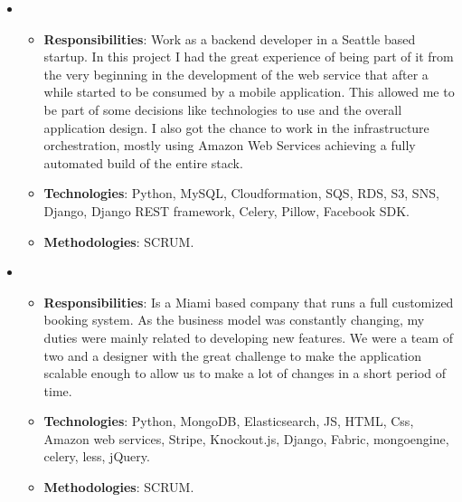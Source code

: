 \documentclass[11pt,a4paper,sans]{moderncv}        %
\begin{document}
  {
    \begin{itemize}
      \item
        \begin{itemize}
          \item \textbf{Responsibilities}: Work as a backend developer in a Seattle based startup. In this project I had the great experience of being part of it from the very beginning in the development of the web service that after a while started to be consumed by a mobile application. This allowed me to be part of some
decisions like technologies to use and the overall application design. I also got the chance to work in the infrastructure orchestration, mostly using Amazon Web Services achieving a fully automated build of the entire stack.
          \item \textbf{Technologies}:  Python, MySQL, Cloudformation, SQS, RDS, S3, SNS, Django, Django REST framework, Celery, Pillow, Facebook SDK.
          \item \textbf{Methodologies}: SCRUM.
        \end{itemize}
    \end{itemize}
  }

  {
    \begin{itemize}
      \item
        \begin{itemize}
          \item \textbf{Responsibilities}: Is a Miami based company that runs a full customized booking system. As the business model was constantly changing, my duties were mainly related to developing new features. We were a team of two and a designer with the great challenge to make the application scalable enough to allow us to make a lot of changes in a short period of time.
          \item \textbf{Technologies}:  Python, MongoDB, Elasticsearch, JS, HTML, Css, Amazon web services, Stripe, Knockout.js, Django, Fabric, mongoengine, celery, less, jQuery.
          \item \textbf{Methodologies}: SCRUM.
        \end{itemize}
    \end{itemize}
  }
\end{document}
